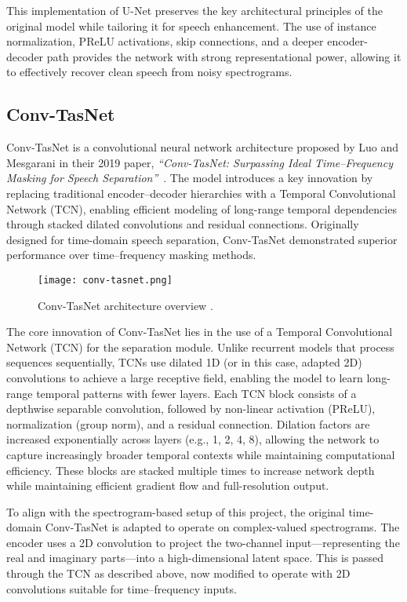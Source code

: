 This implementation of U-Net preserves the key architectural principles of the original model while tailoring it for speech enhancement. The use of instance normalization, PReLU activations, skip connections, and a deeper encoder-decoder path provides the network with strong representational power, allowing it to effectively recover clean speech from noisy spectrograms.

\subsection{Conv-TasNet}
\label{sec:convtasnet}

Conv-TasNet is a convolutional neural network architecture proposed by Luo and Mesgarani in their 2019 paper, \textit{``Conv-TasNet: Surpassing Ideal Time--Frequency Masking for Speech Separation''}~\cite{luo2019conv}. The model introduces a key innovation by replacing traditional encoder–decoder hierarchies with a Temporal Convolutional Network (TCN), enabling efficient modeling of long-range temporal dependencies through stacked dilated convolutions and residual connections. Originally designed for time-domain speech separation, Conv-TasNet demonstrated superior performance over time–frequency masking methods.

\begin{figure}[h]
    \centering
    \texttt{[image: conv-tasnet.png]}
    \caption{\label{fig:convtasnet}Conv-TasNet architecture overview \cite{luo2019conv}.}
\end{figure}

The core innovation of Conv-TasNet lies in the use of a Temporal Convolutional Network (TCN) for the separation module. Unlike recurrent models that process sequences sequentially, TCNs use dilated 1D (or in this case, adapted 2D) convolutions to achieve a large receptive field, enabling the model to learn long-range temporal patterns with fewer layers. Each TCN block consists of a depthwise separable convolution, followed by non-linear activation (PReLU), normalization (group norm), and a residual connection. Dilation factors are increased exponentially across layers (e.g., 1, 2, 4, 8), allowing the network to capture increasingly broader temporal contexts while maintaining computational efficiency. These blocks are stacked multiple times to increase network depth while maintaining efficient gradient flow and full-resolution output.

To align with the spectrogram-based setup of this project, the original time-domain Conv-TasNet is adapted to operate on complex-valued spectrograms. The encoder uses a 2D convolution to project the two-channel input—representing the real and imaginary parts—into a high-dimensional latent space. This is passed through the TCN as described above, now modified to operate with 2D convolutions suitable for time–frequency inputs.

